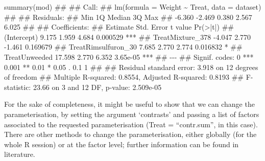 \documentclass[a4paper,12pt,oneside]{book}
\newenvironment{Shaded}{\begin{snugshade}}{\end{snugshade}}
\newcommand{\SpecialCharTok}[1]{#1}
\newcommand{\StringTok}[1]{#1}
\newcommand{\DocumentationTok}[1]{#1}
\newcommand{\OtherTok}[1]{#1}
\newcommand{\FunctionTok}[1]{#1}
\newcommand{\AttributeTok}[1]{#1}
\newcommand{\NormalTok}[1]{#1}
\begin{document}
\begin{Shaded}
\begin{Highlighting}[]
\FunctionTok{summary}\NormalTok{(mod)}
\DocumentationTok{\#\# }
\DocumentationTok{\#\# Call:}
\DocumentationTok{\#\# lm(formula = Weight \textasciitilde{} Treat, data = dataset)}
\DocumentationTok{\#\# }
\DocumentationTok{\#\# Residuals:}
\DocumentationTok{\#\#    Min     1Q Median     3Q    Max }
\DocumentationTok{\#\# {-}6.360 {-}2.469  0.380  2.567  6.025 }
\DocumentationTok{\#\# }
\DocumentationTok{\#\# Coefficients:}
\DocumentationTok{\#\#                     Estimate Std. Error t value Pr(\textgreater{}|t|)    }
\DocumentationTok{\#\# (Intercept)            9.175      1.959   4.684 0.000529 ***}
\DocumentationTok{\#\# TreatMixture\_378      {-}4.047      2.770  {-}1.461 0.169679    }
\DocumentationTok{\#\# TreatRimsulfuron\_30    7.685      2.770   2.774 0.016832 *  }
\DocumentationTok{\#\# TreatUnweeded         17.598      2.770   6.352 3.65e{-}05 ***}
\DocumentationTok{\#\# {-}{-}{-}}
\DocumentationTok{\#\# Signif. codes:  0 \textquotesingle{}***\textquotesingle{} 0.001 \textquotesingle{}**\textquotesingle{} 0.01 \textquotesingle{}*\textquotesingle{} 0.05 \textquotesingle{}.\textquotesingle{} 0.1 \textquotesingle{} \textquotesingle{} 1}
\DocumentationTok{\#\# }
\DocumentationTok{\#\# Residual standard error: 3.918 on 12 degrees of freedom}
\DocumentationTok{\#\# Multiple R{-}squared:  0.8554, Adjusted R{-}squared:  0.8193 }
\DocumentationTok{\#\# F{-}statistic: 23.66 on 3 and 12 DF,  p{-}value: 2.509e{-}05}
\end{Highlighting}
\end{Shaded}

\normalsize

For the sake of completeness, it might be useful to show that we can change the parameterisation, by setting the argument `contrasts' and passing a list of factors associated to the requested parameterisation (Treat = ``contr.sum'', in this case). There are other methods to change the parameterisation, either globally (for the whole R session) or at the factor level; further information can be found in literature.

\vspace{12pt}

\begin{Shaded}
\end{Shaded}
\end{document}
